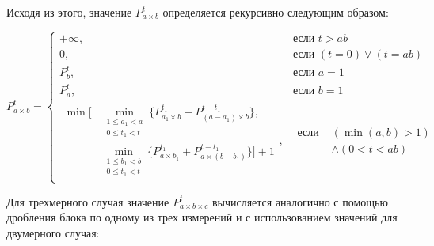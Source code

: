 Исходя из этого, значение $P_{a \times b}^t$ определяется рекурсивно следующим образом:

\begin{equation}\label{eqn:par_pnmt_2d}
P_{a \times b}^t =
	\begin{cases}
		+\infty, & \text{если } t > ab \\
		0, & \text{если } (t = 0) \vee (t = ab) \\
		P_b^t, & \text{если } a = 1 \\
		P_a^t, & \text{если } b = 1 \\
		\begin{aligned}
			\min\big[
				& \min_{\substack{1 \le a_1 < a \\ 0 \le t_1 < t}}{\{P_{a_1 \times b}^{t_1} + P_{(a - a_1) \times b}^{t - t_1}\}}, \\[-8pt]
				& \min_{\substack{1 \le b_1 < b \\ 0 \le t_1 < t}}{\{P_{a \times b_1}^{t_1} + P_{a \times (b - b_1)}^{t - t_1}\}}
			\big] + 1
		\end{aligned}, &
			\begin{aligned}
				\text{если } & (\min(a, b) > 1) \\[-10pt]
				& \wedge (0 < t < ab)
			\end{aligned}
	\end{cases}
\end{equation}

Для трехмерного случая значение $P_{a \times b \times c}^t$ вычисляется аналогично с помощью дробления блока по одному из трех измерений и с использованием значений для двумерного случая:

